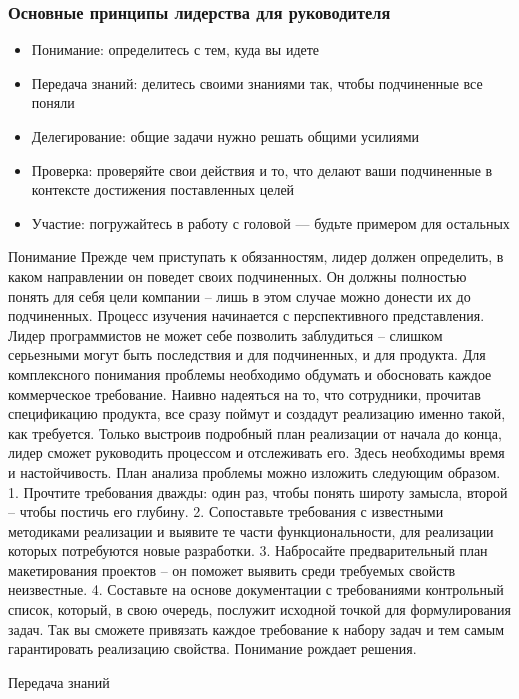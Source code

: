\documentclass{../industrial-development}
\begin{document}
\begin{frame} \frametitle {Основные принципы лидерства для руководителя}

\begin{itemize}
	\item Понимание: определитесь с тем, куда вы идете
	\item Передача знаний: делитесь своими знаниями так, чтобы подчиненные все поняли
	\item Делегирование: общие задачи нужно решать общими усилиями
	\item Проверка: проверяйте свои действия и то, что делают ваши подчиненные в контексте достижения 	поставленных целей
	\item Участие: погружайтесь в работу с головой --- будьте примером для остальных
\end{itemize}
\end{frame}
\lecturenotes Понимание
Прежде чем приступать к обязанностям, лидер должен определить, в каком направлении он поведет своих подчиненных. Он должны полностью понять для себя цели компании – лишь в этом случае можно донести их до подчиненных. Процесс изучения начинается с перспективного представления. Лидер программистов не может себе позволить заблудиться – слишком серьезными могут быть последствия и для подчиненных, и для продукта. Для комплексного понимания проблемы необходимо обдумать и обосновать каждое коммерческое требование. Наивно надеяться на то, что сотрудники, прочитав спецификацию продукта, все сразу поймут и создадут реализацию именно такой, как требуется. Только выстроив подробный план реализации от начала до конца, лидер сможет руководить процессом и отслеживать его. Здесь необходимы время и настойчивость. План анализа проблемы можно изложить следующим образом. 
1. Прочтите требования дважды: один раз, чтобы понять широту замысла, второй – чтобы постичь его глубину.
2. Сопоставьте требования с известными методиками реализации и выявите те части функциональности, для реализации которых потребуются новые разработки. 
3. Набросайте предварительный план макетирования проектов – он поможет выявить среди требуемых свойств неизвестные. 
4. Составьте на основе документации с требованиями контрольный список, который, в свою очередь, послужит исходной точкой для формулирования задач. Так вы сможете привязать каждое требование к набору задач и тем самым гарантировать реализацию свойства. Понимание рождает решения.


\lecturenotes Передача знаний
\end{document}
